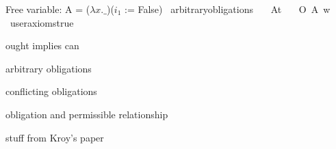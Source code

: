 \begin{isabellebody}
{  Free variable:
    A = ($\lambda x. \_$)($i_1$ := False)\color{black}%
}\isanewline
%
%
\endisatagproof
{\isafoldproof}%
%
\isadelimproof
%
\endisadelimproof
\isanewline
\isanewline
{}\isamarkupfalse%
\ arbitrary{\isacharunderscore}obligations{\isacharcolon}\isanewline
\ \ \ A{\isacharcolon}{\isacharcolon}{\isachardoublequoteopen}t{\isachardoublequoteclose}\isanewline
\ \ \ {\isachardoublequoteopen}O\ {\isacharbraceleft}A{\isacharbraceright}\ w{\isachardoublequoteclose}\isanewline
\ \ \isamarkupfalse%
\ {\isacharbrackleft}user{\isacharunderscore}axioms{\isacharequal}true{\isacharbrackright}%
\isadelimproof
\ %
\endisadelimproof
%
\isatagproof
{}\isamarkupfalse%
%
\endisatagproof
{\isafoldproof}%
%
\isadelimproof
%
\endisadelimproof
%
\begin{isamarkuptext}%
ought implies can%
\end{isamarkuptext}\isamarkuptrue%
%
\begin{isamarkuptext}%
arbitrary obligations%
\end{isamarkuptext}\isamarkuptrue%
%
\begin{isamarkuptext}%
conflicting obligations%
\end{isamarkuptext}\isamarkuptrue%
%
\begin{isamarkuptext}%
obligation and permissible relationship%
\end{isamarkuptext}\isamarkuptrue%
%
\isadelimdocument
%
\endisadelimdocument
%
\isatagdocument
%
\isamarkuptrue%
%
\endisatagdocument
{\isafolddocument}%
%
\isadelimdocument
%
\endisadelimdocument
%
\begin{isamarkuptext}%
stuff from Kroy's paper%
\end{isamarkuptext}\isamarkuptrue%
%
\isadelimtheory
%
\endisadelimtheory
%
\isatagtheory
%
\endisatagtheory
{\isafoldtheory}%
%
\isadelimtheory
%
\endisadelimtheory
%
\end{isabellebody}%
\endinput
